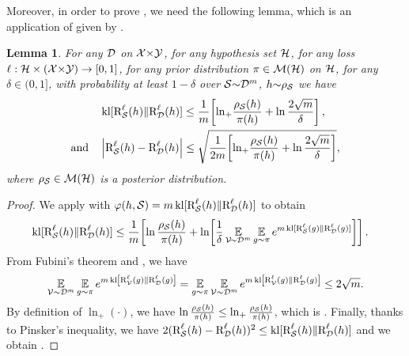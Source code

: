 \documentclass[twoside]{article}
\theoremstyle{plain}
\newtheorem{lemma}[theorem]{Lemma}
\begin{document}
Moreover, in order to prove , we need the following lemma, which is an application of  given by \citet{rivasplata2020pac}.
\begin{lemma}\label{lemma:general-disintegrated-rivasplata-seeger-mcallester}
For any $\mathcal{D}$ on $\mathcal{X}{\times}\mathcal{Y}$, for any hypothesis set $\mathcal{H}$, for any loss $\ell : \mathcal{H}\times(\mathcal{X}{\times}\mathcal{Y}) \to [0,1]$, for any prior distribution $\pi\in\mathcal{M}(\mathcal{H})$ on $\mathcal{H}$, for any $\delta\!\in\!(0,1]$, with probability at least $1{-}\delta$ over $\mathcal{S}{\sim}\mathcal{D}^m$, $h{\sim}\rho_{\mathcal{S}}$ we have
\begin{align}
&\operatorname{kl}[\text{R}^{\ell}_{\mathcal{S}}(h) \|\text{R}^{\ell}_{\mathcal{D}}(h)] \le \frac{1}{m}\!\left[ \ln_{+}\!\frac{\rho_{\mathcal{S}}(h)}{\pi(h)} + \ln\frac{2\sqrt{m}}{\delta}\right],\label{eq:general-disintegrated-rivasplata-seeger}\\
\text{and}\quad&\left\vert\text{R}^{\ell}_{\mathcal{S}}(h)-\text{R}^{\ell}_{\mathcal{D}}(h)\right\vert \le \sqrt{\frac{1}{2m}\!\left[ \ln_{+}\!\frac{\rho_{\mathcal{S}}(h)}{\pi(h)} + \ln\frac{2\sqrt{m}}{\delta}\right]},\label{eq:general-disintegrated-rivasplata-mcallester}
\end{align}
where $\rho_{\mathcal{S}}\in\mathcal{M}(\mathcal{H})$ is a posterior distribution.
\end{lemma}
\begin{proof}
We apply  with $\varphi(h,\mathcal{S})=m\operatorname{kl}[\text{R}^{\ell}_{\mathcal{S}}(h) \|\text{R}^{\ell}_{\mathcal{D}}(h)]$ to obtain 
\begin{align*}
\operatorname{kl}[\text{R}^{\ell}_{\mathcal{S}}(h) \|\text{R}^{\ell}_{\mathcal{D}}(h)] &\le \frac{1}{m}\!\left[ \ln\frac{\rho_{\mathcal{S}}(h)}{\pi(h)} + \ln\!\left[\frac{1}{\delta} \operatorname*{\mathbb{E}}_{\mathcal{V}\!{\sim}\mathcal{D}^m}\operatorname*{\mathbb{E}}_{g{\sim}\pi} e^{m\operatorname{kl}[\text{R}^{\ell}_{\mathcal{S}}(g) \|\text{R}^{\ell}_{\mathcal{D}}(g)]}\right]\right].
\end{align*}
From Fubini's theorem and \citet{maurer2004note}, we have
\begin{align}
\operatorname*{\mathbb{E}}_{\mathcal{V}\sim\mathcal{D}^m}\operatorname*{\mathbb{E}}_{g\sim\pi}e^{m\operatorname{kl}\left[\text{R}^{\ell}_{\mathcal{V}}(g) \|\text{R}^{\ell}_{\mathcal{D}}(g)\right]} =  \operatorname*{\mathbb{E}}_{g\sim\pi}\operatorname*{\mathbb{E}}_{\mathcal{V}\sim\mathcal{D}^m}e^{m\operatorname{kl}\left[\text{R}^{\ell}_{\mathcal{V}}(g) \|\text{R}^{\ell}_{\mathcal{D}}(g)\right]} \leq 2\sqrt{m}.
\end{align}
By definition of $\ln_{+}(\cdot)$, we have $\ln\frac{\rho_{\mathcal{S}}(h)}{\pi(h)} \le \ln_{+}\frac{\rho_{\mathcal{S}}(h)}{\pi(h)}$, which is .
Finally, thanks to Pinsker's inequality, we have $2(\text{R}^{\ell}_{\mathcal{S}}(h)-\text{R}^{\ell}_{\mathcal{D}}(h))^2 \le \operatorname{kl}[\text{R}^{\ell}_{\mathcal{S}}(h) \|\text{R}^{\ell}_{\mathcal{D}}(h)]$ and 
we obtain .
\end{proof}
\end{document}
